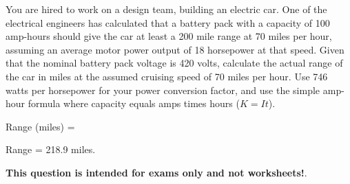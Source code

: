 

You are hired to work on a design team, building an electric car.  One of the electrical engineers has calculated that a battery pack with a capacity of 100 amp-hours should give the car at least a 200 mile range at 70 miles per hour, assuming an average motor power output of 18 horsepower at that speed.  Given that the nominal battery pack voltage is 420 volts, calculate the actual range of the car in miles at the assumed cruising speed of 70 miles per hour.  Use 746 watts per horsepower for your power conversion factor, and use the simple amp-hour formula where capacity equals amps times hours ($K = It$).

\vskip 10pt

Range (miles) = 







Range = 218.9 miles.







{\bf This question is intended for exams only and not worksheets!}.



